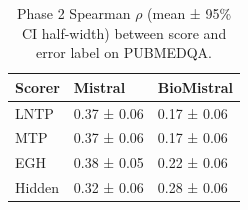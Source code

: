 \begin{table}
\caption{Phase 2 Spearman $\rho$ (mean ± 95\% CI half-width) between score and error label on PUBMEDQA.}
\label{tab:phase2_spearman_pubmedqa}
\begin{tabular}{lll}
\toprule
Scorer & Mistral & BioMistral \\
\midrule
LNTP & 0.37 ± 0.06 & 0.17 ± 0.06 \\
MTP & 0.37 ± 0.06 & 0.17 ± 0.06 \\
EGH & 0.38 ± 0.05 & 0.22 ± 0.06 \\
Hidden & 0.32 ± 0.06 & 0.28 ± 0.06 \\
\bottomrule
\end{tabular}
\end{table}
